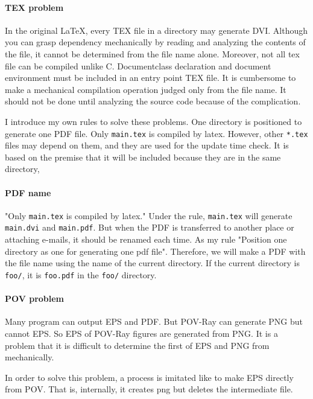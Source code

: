 \documentclass[a4paper,12pt]{jsarticle}
\begin{document}
\paragraph {TEX problem}

In the original \LaTeX,
every TEX file in a directory may generate DVI.
Although you can grasp dependency mechanically by reading and analyzing the contents of the file,
it cannot be determined from the file name alone.
Moreover, not all tex file can be compiled unlike C.
Documentclass declaration and document environment must be included in
an entry point TEX file.
It is cumbersome to make a mechanical compilation operation judged
only from the file name.
It should not be done until analyzing the source code because of the complication.

I introduce my own rules to solve these problems.
One directory is positioned to generate one PDF file.
Only \verb/main.tex/ is compiled by latex.
However, other \verb/*.tex/ files may depend on them,
and they are used for the update time check.
It is based on the premise that
it will be included because they are in the same directory, 

\paragraph {PDF name}

"Only \verb/main.tex/ is compiled by latex."
Under the rule,
\verb/main.tex/ will generate \verb/main.dvi/ and \verb/main.pdf/.
But when the PDF is transferred to another place or attaching e-mails,
it should be renamed each time.
As my rule
"Position one directory as one for generating one pdf file".
Therefore, we will make a PDF with the file name using the name of the current directory.
If the current directory is \verb|foo/|, it is \verb/foo.pdf/ in the \verb|foo/| directory.

\paragraph {POV problem}

Many program can output EPS and PDF.
But POV-Ray can generate PNG but cannot EPS.
So EPS of POV-Ray figures are generated from PNG.
It is a problem that
it is difficult to determine the first of EPS and PNG from mechanically.

In order to solve this problem,
a process is imitated like to make EPS directly from POV.
That is, internally, it creates png but deletes the intermediate file.
\end{document}
